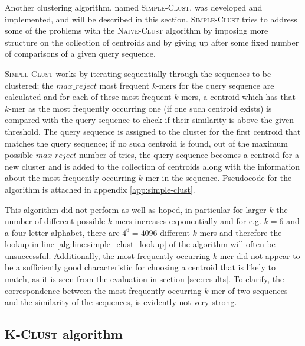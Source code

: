 Another clustering algorithm, named \textsc{Simple-Clust}, was developed and
implemented, and will be described in this section. \textsc{Simple-Clust}
tries to address some of the problems with the \textsc{Naive-Clust} algorithm
by imposing more structure on the collection of centroids and by giving up
after some fixed number of comparisons of a given query sequence.

\textsc{Simple-Clust} works by iterating sequentially through the sequences to
be clustered; the $max\_reject$ most frequent $k$-mers for the query sequence
are calculated and for each of these most frequent $k$-mers, a centroid which
has that $k$-mer as the most frequently occurring one (if one such centroid
exists) is compared with the query sequence to check if their similarity is
above the given threshold. The query sequence is assigned to the cluster for
the first centroid that matches the query sequence; if no such centroid is
found, out of the maximum possible $max\_reject$ number of tries, the query
sequence becomes a centroid for a new cluster and is added to the collection of
centroids along with the information about the most frequently occurring
$k$-mer in the sequence. Pseudocode for the algorithm is attached in appendix
\ref{app:simple-clust}.

This algorithm did not perform as well as hoped, in particular for larger $k$
the number of different possible $k$-mers increases exponentially and for e.g.
$k = 6$ and a four letter alphabet, there are $4^6 = 4096$ different $k$-mers
and therefore the lookup in line \ref{alg:line:simple_clust_lookup} of the
algorithm will often be unsuccessful. Additionally, the most frequently
occurring $k$-mer did not appear to be a sufficiently good characteristic for
choosing a centroid that is likely to match, as it is seen from the evaluation
in section \ref{sec:results}. To clarify, the correspondence between the most
frequently occurring $k$-mer of two sequences and the similarity of the
sequences, is evidently not very strong.


\subsection{\textsc{K-Clust} algorithm}
\label{sec:k-clust_algorithm}

